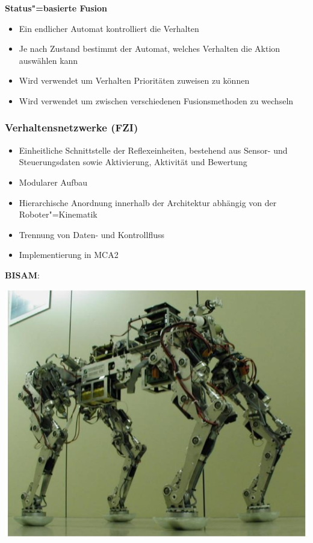 \textbf{Status"=basierte Fusion}
\begin{itemize}
	\item Ein endlicher Automat kontrolliert die Verhalten
	\item Je nach Zustand bestimmt der Automat, welches Verhalten die Aktion auswählen kann
	\item Wird verwendet um Verhalten Prioritäten zuweisen zu können
	\item Wird verwendet um zwischen verschiedenen Fusionsmethoden zu wechseln
\end{itemize}

\subsubsection{Verhaltensnetzwerke (FZI)}
\begin{itemize}
	\item Einheitliche Schnittstelle der Reflexeinheiten, bestehend aus Sensor- und Steuerungsdaten sowie Aktivierung, Aktivität und Bewertung
	\item Modularer Aufbau
	\item Hierarchische Anordnung innerhalb der Architektur abhängig von der Roboter"=Kinematik
	\item Trennung von Daten- und Kontrollfluss
	\item Implementierung in MCA2
\end{itemize}

\textbf{BISAM}:\\
\begin{center}
\includegraphics[width=.5\textwidth]{figures/bisam.png}
\end{center}

